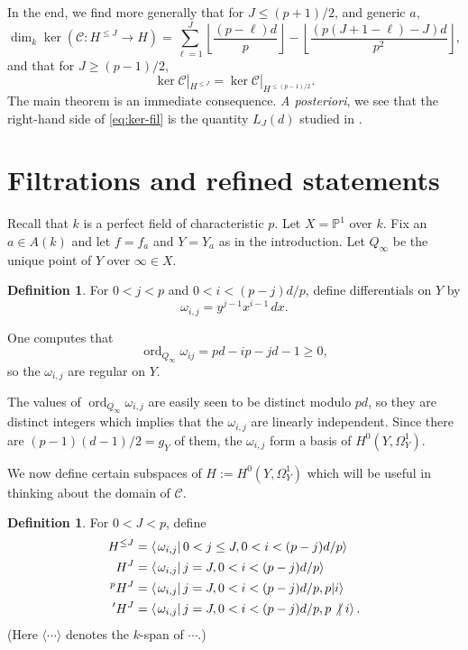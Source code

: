 \documentclass[12pt,reqno]{amsart}
\numberwithin{equation}{section}
\theoremstyle{plain}
\theoremstyle{definition}
\newtheorem{defn}[subsection]{Definition}
\theoremstyle{remark}
\numberwithin{equation}{section}
\newcommand{\CC}{\mathcal{C}}
\renewcommand{\P}{\mathbb{P}}
\newcommand{\<}{\langle}
\renewcommand{\>}{\rangle}
\newcommand{\nodiv}{\not|}
\def\nodiv{\mathrel{\mathchoice{\not|}{\not|}{\kern-.2em\not\kern.2em|}
{\kern-.2em\not\kern.2em|}}}
\DeclareMathOperator{\ord}{ord}
\def\HJ{H^J}
\def\HlJ{H^{\le J}}
\def\prH{{}'H^J}
\def\pH{{}^pH^J}
\begin{document}
In the end, we find more generally that for $J\le (p+1)/2$, and
generic $a$,
  \begin{equation}\label{eq:ker-fil}
\dim_k\ker\left(\CC:H^{\le J}\to H\right)=
    \sum_{\ell=1}^J
    \left\lfloor\frac{(p-\ell)d}{p}\right\rfloor
    -\left\lfloor\frac{(p(J+1-\ell)-J)d}{p^2}\right\rfloor,    
  \end{equation}
  and that for $J\ge(p-1)/2$,
  \[\ker\CC|_{H^{\le J}}=\ker\CC|_{H^{\le(p-1)/2}}.\]
The main theorem is an immediate consequence.  \emph{A posteriori}, we
see that the right-hand side of \eqref{eq:ker-fil} is the quantity
$L_J(d)$ studied in \cite{BooherPriesetal22}.


\section{Filtrations and refined statements}\label{s:fils}
Recall that $k$ is a perfect field of characteristic $p$.  Let
$X=\P^1$ over $k$.
Fix an $a\in A(k)$ and let $f=f_a$ and $Y=Y_a$
as in the introduction.  Let $Q_\infty$ be the unique point of $Y$ over
$\infty\in X$.

\begin{defn}\label{def:omega}
For  $0<j<p$ and $0<i<(p-j)d/p$, 
define differentials on $Y$ by
\[\omega_{i,j}=y^{j-1}x^{i-1}\,dx.\]
\end{defn}

One computes that
\[\ord_{Q_\infty}\omega_{ij}=pd-ip-jd-1\ge0,\]
so the $\omega_{i,j}$ are regular on $Y$.

The values of $\ord_{Q_\infty}\omega_{i,j}$ are easily seen to be
distinct modulo $pd$, so they are distinct integers which implies that
the $\omega_{i,j}$ are linearly independent.  Since there are
$(p-1)(d-1)/2=g_Y$ of them, the $\omega_{i,j}$ form a
basis of $H^0(Y,\Omega^1_Y)$.

We now define certain subspaces of $H:=H^0(Y,\Omega^1_Y)$ which will
be useful in thinking about the domain of $\CC$.

\begin{defn}\label{def:HJ}
For $0<J<p$, define
\begin{align*}
\HlJ&=\left\<\left.\omega_{i,j}\right| 0<j\le J,
        0<i<(p-j)d/p\right\>\\
\HJ&=\left\<\left.\omega_{i,j}\right| j=J,
        0<i<(p-j)d/p\right\>\\
\pH&=\left\<\left.\omega_{i,j}\right| j=J,
        0<i<(p-j)d/p, p|i\right\>\\
\prH&=\left\<\left.\omega_{i,j}\right| j=J,
        0<i<(p-j)d/p,p\nodiv i\right\>.
\end{align*}
(Here $\<\cdots\>$ denotes the $k$-span of $\cdots$.)  
\end{defn}
\end{document}
